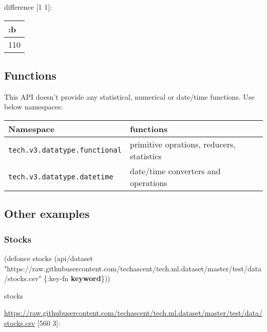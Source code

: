 \documentclass[]{article}
\newenvironment{Shaded}{\begin{snugshade}}{\end{snugshade}}
\newcommand{\AttributeTok}[1]{\textcolor[rgb]{0.77,0.63,0.00}{#1}}
\newcommand{\BuiltInTok}[1]{#1}
\newcommand{\FunctionTok}[1]{\textcolor[rgb]{0.00,0.00,0.00}{#1}}
\newcommand{\KeywordTok}[1]{\textcolor[rgb]{0.13,0.29,0.53}{\textbf{#1}}}
\newcommand{\NormalTok}[1]{#1}
\newcommand{\StringTok}[1]{\textcolor[rgb]{0.31,0.60,0.02}{#1}}
\begin{document}
difference {[}1 1{]}:

\begin{longtable}[]{@{}l@{}}
\toprule
:b\tabularnewline
\midrule
\endhead
110\tabularnewline
\bottomrule
\end{longtable}

\hypertarget{functions}{%
\subsection{Functions}\label{functions}}

This API doesn't provide any statistical, numerical or date/time
functions. Use below namespaces:

\begin{longtable}[]{@{}ll@{}}
\toprule
Namespace & functions\tabularnewline
\midrule
\endhead
\texttt{tech.v3.datatype.functional} & primitive oprations, reducers,
statistics\tabularnewline
\texttt{tech.v3.datatype.datetime} & date/time converters and
operations\tabularnewline
\bottomrule
\end{longtable}

\hypertarget{other-examples}{%
\subsection{Other examples}\label{other-examples}}

\hypertarget{stocks}{%
\subsubsection{Stocks}\label{stocks}}

\begin{Shaded}
\begin{Highlighting}[]
\NormalTok{(}\BuiltInTok{defonce}\FunctionTok{ stocks }\NormalTok{(api/dataset }\StringTok{"https://raw.githubusercontent.com/techascent/tech.ml.dataset/master/test/data/stocks.csv"}\NormalTok{ \{}\AttributeTok{:key-fn} \KeywordTok{keyword}\NormalTok{\}))}
\end{Highlighting}
\end{Shaded}

\begin{Shaded}
\begin{Highlighting}[]
\NormalTok{stocks}
\end{Highlighting}
\end{Shaded}

\url{https://raw.githubusercontent.com/techascent/tech.ml.dataset/master/test/data/stocks.csv}
{[}560 3{]}:
\end{document}
